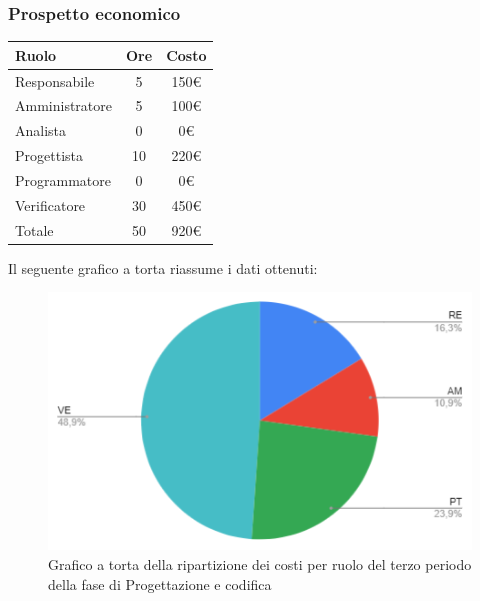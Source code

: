 {{{{{{{{{{{{{{		\subsubsection{Prospetto economico}\label{PreventivoFaseDiProgettazioneDiDettaglioECodificaProspettoEconomicoPeriodo3}
		\quad
		\def\tabularxcolumn#1{m{#1}}
		{
			\begin{center}
				\renewcommand{\arraystretch}{1.4}
				\begin{tabularx}{7cm}{|X|c|c|}
					\hline
					\rowcolor{airforceblue}
					\textbf{Ruolo} & \textbf{Ore} & \textbf{Costo}\\
					\hline
					Responsabile & 5 & 150\euro\\
					\hline
					Amministratore & 5 & 100\euro\\
					\hline
					Analista & 0 & 0\euro\\
					\hline
					Progettista & 10 & 220\euro\\
					\hline
					Programmatore & 0 & 0\euro\\
					\hline
					Verificatore & 30 & 450\euro\\
					\hline
					Totale & 50 & 920\euro\\
					\hline
				\end{tabularx}
			\end{center}
			
			Il seguente grafico a torta riassume i dati ottenuti:
			\begin{figure}[!ht]
				\begin{center}
					\includegraphics[width=0.8\linewidth]{../immagini/pdp/torta_progettazione_dettaglio_periodo3.png}
					\caption{Grafico a torta della ripartizione dei costi per ruolo del terzo periodo della fase di Progettazione e codifica}
				\end{center}
			\end{figure}
		
}}}}}}}}}}}}}}}
